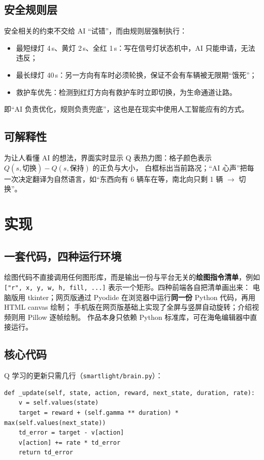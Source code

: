 \documentclass[UTF8,a4paper,zihao=-4,fontset=none]{ctexart}
\begin{document}
\subsection{安全规则层}
安全相关的约束不交给 AI “试错”，而由规则层强制执行：
\begin{itemize}
  \item 最短绿灯 4\,s、黄灯 2\,s、全红 1\,s：写在信号灯状态机中，AI 只能申请，无法违反；
  \item 最长绿灯 40\,s：另一方向有车时必须轮换，保证不会有车辆被无限期“饿死”；
  \item 救护车优先：检测到红灯方向有救护车时立即切换，为生命通道让路。
\end{itemize}
即“AI 负责优化，规则负责兜底”，这也是在现实中使用人工智能应有的方式。

\subsection{可解释性}
为让人看懂 AI 的想法，界面实时显示 Q 表热力图：格子颜色表示 $Q(s,\text{切换})-Q(s,\text{保持})$ 的正负与大小，
白框标出当前路况；“AI 心声”把每一次决定翻译为自然语言，如“东西向有 6 辆车在等，南北向只剩 1 辆 $\to$ 切换”。

\section{实现}

\subsection{一套代码，四种运行环境}
绘图代码不直接调用任何图形库，而是输出一份与平台无关的\textbf{绘图指令清单}，例如
\verb|["r", x, y, w, h, fill, ...]| 表示一个矩形。四种前端各自把清单画出来：
电脑版用 tkinter；网页版通过 Pyodide 在浏览器中运行\textbf{同一份} Python 代码，再用 HTML canvas 绘制；
手机版在网页版基础上实现了全屏与竖屏自动旋转；介绍视频则用 Pillow 逐帧绘制。
作品本身只依赖 Python 标准库，可在海龟编辑器中直接运行。

\subsection{核心代码}
Q 学习的更新只需几行（\texttt{smartlight/brain.py}）：
\begin{lstlisting}
def _update(self, state, action, reward, next_state, duration, rate):
    v = self.values(state)
    target = reward + (self.gamma ** duration) * max(self.values(next_state))
    td_error = target - v[action]
    v[action] += rate * td_error
    return td_error
\end{lstlisting}
\end{document}
